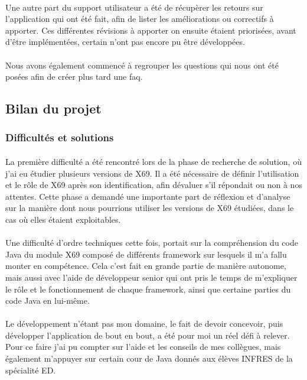 \documentclass[12pt,a4paper]{report}
\begin{document}
\paragraph*{}Une autre part du support utilisateur a été de récupèrer les retours sur l'application qui ont été fait, afin de lister les améliorations ou correctifs à apporter. Ces différentes révisions à apporter on ensuite étaient priorisées, avant d'être implémentées, certain n'ont pas encore pu être développées.
\paragraph*{}Nous avons également commencé à regrouper les questions qui nous ont été posées afin de créer plus tard une \gls{faq}. \\ 

\subsection{Bilan du projet}
\subsubsection{Difficultés et solutions}
\paragraph*{}La première difficulté a été rencontré lors de la phase de recherche de solution, où j'ai eu étudier plusieurs versions de X69. Il a été nécessaire de définir l’utilisation et le rôle de X69 après son identification, afin dévaluer s’il répondait ou non à nos attentes. Cette phase a demandé une importante part de réflexion et d’analyse sur la manière dont nous pourrions utiliser les versions de X69 étudiées, dans le cas où elles étaient exploitables.
\paragraph*{}Une difficulté d'ordre techniques cette fois, portait sur la compréhension du code Java du module X69 composé de différents framework sur lesquels il m'a fallu monter en compétence. Cela c'est fait en grande partie de manière autonome, mais aussi avec l'aide de développeur senior qui ont pris le temps de m'expliquer le rôle et le fonctionnement de chaque framework, ainsi que certaine parties du code Java en lui-même. 
\paragraph*{}Le développement n'étant pas mon domaine, le fait de devoir concevoir, puis développer l'application de bout en bout, a été pour moi un réel défi à relever. Pour ce faire j'ai pu compter sur l'aide et les conseils de mes collègues, mais également m'appuyer sur certain cour de Java donnés aux élèves INFRES de la spécialité ED. 
\end{document}
